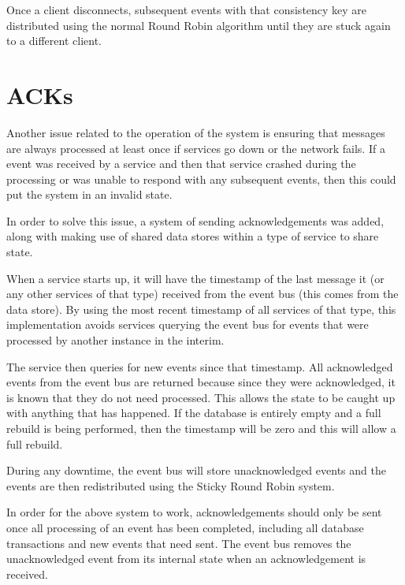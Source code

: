 \documentclass{l3proj}
\begin{document}
Once a client disconnects, subsequent events with that consistency key are distributed using the normal Round Robin algorithm until they are stuck again to a different client.

\section{ACKs}
\label{sec:acks}

Another issue related to the operation of the system is ensuring that messages are always processed at least once if services go down or the network fails. If a event was received by a service and then that service crashed during the processing or was unable to respond with any subsequent events, then this could put the system in an invalid state.

In order to solve this issue, a system of sending acknowledgements was added, along with making use of shared data stores within a type of service to share state.

When a service starts up, it will have the timestamp of the last message it (or any other services of that type) received from the event bus (this comes from the data store). By using the most recent timestamp of all services of that type, this implementation avoids services querying the event bus for events that were processed by another instance in the interim.

The service then queries for new events since that timestamp. All acknowledged events from the event bus are returned because since they were acknowledged, it is known that they do not need processed. This allows the state to be caught up with anything that has happened. If the database is entirely empty and a full rebuild is being performed, then the timestamp will be zero and this will allow a full rebuild.

During any downtime, the event bus will store unacknowledged events and the events are then redistributed using the Sticky Round Robin system.

In order for the above system to work, acknowledgements should only be sent once all processing of an event has been completed, including all database transactions and new events that need sent. The event bus removes the unacknowledged event from its internal state when an acknowledgement is received.

\end{document}
